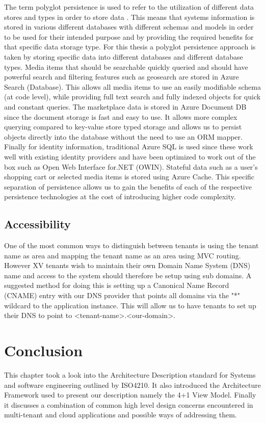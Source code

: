 The term polyglot persistence is used to refer to the utilization of different data stores and types in order to store data \cite{Sadalage2012-zw}. This means that systems information is stored in various different databases with different schemas and models in order to be used for their intended purpose and by providing the required benefits for that specific data storage type. For this thesis a polyglot persistence approach is taken by storing specific data into different databases and different database types. Media items that should be searchable quickly queried and should have powerful search and filtering features such as geosearch are stored in Azure Search  (Database). This allows all media items to use an easily modifiable schema (at code level), while providing full text search and fully indexed objects for quick and constant queries. The marketplace data is stored in Azure Document DB  since the document storage is fast and easy to use. It allows more complex querying compared to key-value store typed storage and allows us to persist objects directly into the database without the need to use an ORM mapper. Finally for identity information, traditional Azure SQL is used since these work well with existing identity providers and have been optimized to work out of the box such as Open Web Interface for.NET (OWIN). Stateful data such as a user's shopping cart or selected media items is stored using Azure Cache. This specific separation of persistence allows us to gain the benefits of each of the respective persistence technologies at the cost of introducing higher code complexity.


\subsection{Accessibility}

One of the most common ways to distinguish between tenants is using the tenant name as area and mapping the tenant name as an area using MVC routing. However XV tenants wish to maintain their own Domain Name System (DNS) name and access to the system should therefore be setup using sub domains. A suggested method for doing this is setting up a Canonical Name Record (CNAME) entry with our DNS provider that points all domains via the "*" wildcard to the application instance. This will allow us to have tenants to set up their DNS to point to <tenant-name>.<our-domain>.


\section{Conclusion}
This chapter took a look into the Architecture Description standard for Systems and software engineering outlined by ISO4210. It also introduced the Architecture Framework used to present our description namely the 4+1 View Model. Finally it discusses a combination of common high level design concerns encountered in multi-tenant and cloud applications and possible ways of addressing them. 